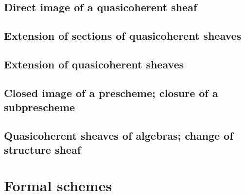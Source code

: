 \documentclass{book}
\begin{document}
        \subsection{Direct image of a quasicoherent sheaf}

        

        

        \subsection{Extension of sections of quasicoherent sheaves}

        

        

        \subsection{Extension of quasicoherent sheaves}

        

        

        \subsection{Closed image of a prescheme; closure of a subprescheme}

        

        

        \subsection{Quasicoherent sheaves of algebras; change of structure sheaf}

        

        

    \section{Formal schemes}




\end{document}
